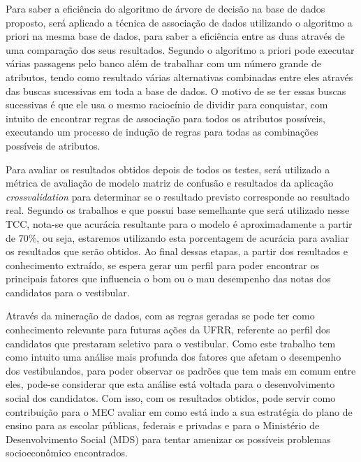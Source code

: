 \par
Para saber a eficiência do algoritmo de árvore de decisão na base de dados proposto, será aplicado a técnica de associação de dados utilizando o algoritmo a priori na mesma base de dados, para saber a eficiência entre as duas através de uma comparação dos seus resultados. Segundo  o algoritmo a priori pode executar várias passagens pelo banco além de trabalhar com um número grande de atributos, tendo como resultado várias alternativas combinadas entre eles através das buscas sucessivas em toda a base de dados. O motivo de se ter essas buscas sucessivas é que ele usa o mesmo raciocínio de dividir para conquistar, com intuito de encontrar regras de associação para todos os atributos possíveis, executando um processo de indução de regras para todas as combinações possíveis de atributos.


\par
Para avaliar os resultados obtidos depois de todos os testes, será utilizado a métrica de avaliação de modelo matriz de confusão e resultados da aplicação \textit{crossvalidation} para determinar se o resultado previsto corresponde ao resultado real. Segundo os trabalhos  e  que possui base semelhante que será utilizado nesse TCC, nota-se que acurácia resultante para o modelo é aproximadamente a partir de 70\%, ou seja, estaremos utilizando esta porcentagem de acurácia para avaliar os resultados que serão obtidos. Ao final dessas etapas, a partir dos resultados e conhecimento extraído, se espera gerar um perfil para poder encontrar os principais fatores que influencia o bom ou o mau desempenho das notas dos candidatos para o vestibular.

\par 
Através da mineração de dados, com as regras geradas se pode ter como conhecimento relevante para futuras ações da UFRR, referente ao perfil dos candidatos que prestaram seletivo para o vestibular. Como este trabalho tem como intuito uma análise mais profunda dos fatores que afetam o desempenho dos vestibulandos, para poder observar os padrões que tem mais em comum entre eles, pode-se considerar que esta análise está voltada para o desenvolvimento social dos candidatos. Com isso, com os resultados obtidos, pode servir como contribuição para o MEC avaliar em como está indo a sua estratégia do plano de ensino para as escolar públicas, federais e privadas e para o Ministério de Desenvolvimento Social (MDS) para tentar amenizar os possíveis problemas socioeconômico encontrados.

